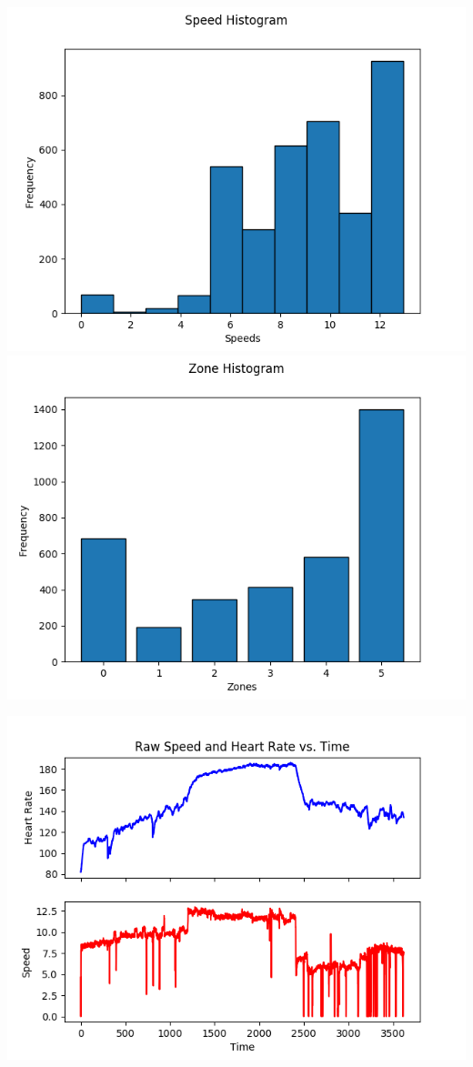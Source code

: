 \documentclass{article}
\begin{document}
\begin{center}
\includegraphics[scale=0.4]{histograms/pace_histogram_2018_05_10_Brian_Mooney.png}
\hspace{0.5in}
\includegraphics[scale=0.4]{histograms/zone_histogram_2018_05_10_Brian_Mooney.png}
\end{center}
\begin{center}
\includegraphics[scale=0.8]{plots/speed_heart_rate_raw_2018_05_10_Brian_Mooney.png}
\end{center}
\end{document}
